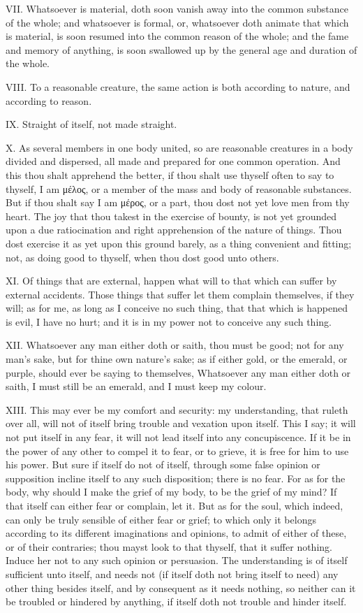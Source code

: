 VII. Whatsoever is material, doth soon vanish away into the common
substance of the whole; and whatsoever is formal, or, whatsoever doth
animate that which is material, is soon resumed into the common reason of
the whole; and the fame and memory of anything, is soon swallowed up by
the general age and duration of the whole.

VIII. To a reasonable creature, the same action is both according
to nature, and according to reason.

IX. Straight of itself, not made straight.

X. As several members in one body united, so are reasonable creatures in
a body divided and dispersed, all made and prepared for one common
operation. And this thou shalt apprehend the better, if thou shalt use
thyself often to say to thyself, I am μέλος, or
a member of the mass and body of reasonable substances. But if thou shalt
say I am μέρος, or a part, thou dost not yet
love men from thy heart. The joy that thou takest in the exercise of
bounty, is not yet grounded upon a due ratiocination and right
apprehension of the nature of things. Thou dost exercise it as yet upon
this ground barely, as a thing convenient and fitting; not, as doing good
to thyself, when thou dost good unto others.

XI. Of things that are external, happen what will to that which can
suffer by external accidents. Those things that suffer let them complain
themselves, if they will; as for me, as long as I conceive no such thing,
that that which is happened is evil, I have no hurt; and it is in my power
not to conceive any such thing.

XII. Whatsoever any man either doth or saith, thou must be good; not for
any man's sake, but for thine own nature's sake; as if either gold, or the
emerald, or purple, should ever be saying to themselves, Whatsoever any
man either doth or saith, I must still be an emerald, and I must keep my
colour.

XIII. This may ever be my comfort and security: my understanding, that
ruleth over all, will not of itself bring trouble and vexation upon
itself. This I say; it will not put itself in any fear, it will not lead
itself into any concupiscence. If it be in the power of any other to
compel it to fear, or to grieve, it is free for him to use his power. But
sure if itself do not of itself, through some false opinion or supposition
incline itself to any such disposition; there is no fear. For as for the
body, why should I make the grief of my body, to be the grief of my mind?
If that itself can either fear or complain, let it. But as for the soul,
which indeed, can only be truly sensible of either fear or grief; to which
only it belongs according to its different imaginations and opinions, to
admit of either of these, or of their contraries; thou mayst look to that
thyself, that it suffer nothing. Induce her not to any such opinion or
persuasion. The understanding is of itself sufficient unto itself, and
needs not (if itself doth not bring itself to need) any other thing
besides itself, and by consequent as it needs nothing, so neither can it
be troubled or hindered by anything, if itself doth not trouble and hinder
itself.

